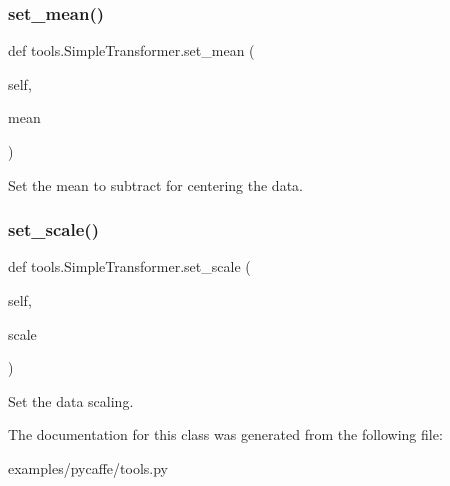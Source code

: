 \subsubsection{\texorpdfstring{set\+\_\+mean()}{set\_mean()}}
{\footnotesize\ttfamily def tools.\+Simple\+Transformer.\+set\+\_\+mean (\begin{DoxyParamCaption}\item[{}]{self,  }\item[{}]{mean }\end{DoxyParamCaption})}

\begin{DoxyVerb}Set the mean to subtract for centering the data.
\end{DoxyVerb}
 \mbox{\label{classtools_1_1_simple_transformer_aa9c52f50225c54f742e4af030db54630}} 
\subsubsection{\texorpdfstring{set\+\_\+scale()}{set\_scale()}}
{\footnotesize\ttfamily def tools.\+Simple\+Transformer.\+set\+\_\+scale (\begin{DoxyParamCaption}\item[{}]{self,  }\item[{}]{scale }\end{DoxyParamCaption})}

\begin{DoxyVerb}Set the data scaling.
\end{DoxyVerb}
 

The documentation for this class was generated from the following file\+:\begin{DoxyCompactItemize}
\item 
examples/pycaffe/tools.\+py\end{DoxyCompactItemize}
